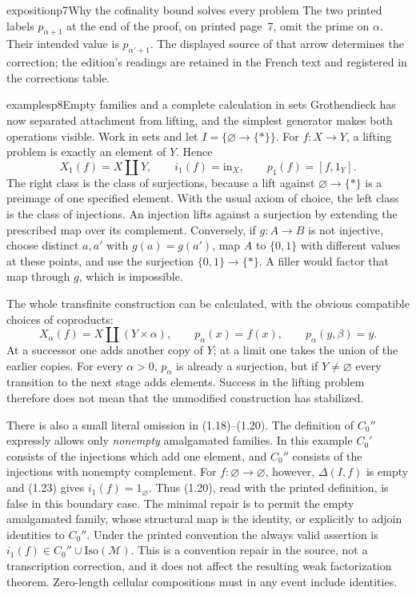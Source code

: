 \begin{dcomment}{exposition}{p7}{Why the cofinality bound solves every problem}
The two printed labels $p_{\alpha+1}$ at the end of the proof, on printed page~7, omit the prime on $\alpha$. Their intended value is $p_{\alpha'+1}$. The displayed source of that arrow determines the correction; the edition's readings are retained in the French text and registered in the corrections table.
\end{dcomment}

\begin{dcomment}{examples}{p8}{Empty families and a complete calculation in sets}
Grothendieck has now separated attachment from lifting, and the simplest generator makes both operations visible. Work in sets and let $I=\{\varnothing\to\{*\}\}$. For $f:X\to Y$, a lifting problem is exactly an element of $Y$. Hence
\[
 X_1(f)=X\amalg Y,\qquad i_1(f)=\mathrm{in}_X,
 \qquad p_1(f)=[f,1_Y].
\]
The right class is the class of surjections, because a lift against $\varnothing\to\{*\}$ is a preimage of one specified element. With the usual axiom of choice, the left class is the class of injections. An injection lifts against a surjection by extending the prescribed map over its complement. Conversely, if $g:A\to B$ is not injective, choose distinct $a,a'$ with $g(a)=g(a')$, map $A$ to $\{0,1\}$ with different values at these points, and use the surjection $\{0,1\}\to\{*\}$. A filler would factor that map through $g$, which is impossible.

The whole transfinite construction can be calculated, with the obvious compatible choices of coproducts:
\[
 X_\alpha(f)=X\amalg(Y\times\alpha),\qquad
 p_\alpha(x)=f(x),\qquad p_\alpha(y,\beta)=y.
\]
At a successor one adds another copy of $Y$; at a limit one takes the union of the earlier copies. For every $\alpha>0$, $p_\alpha$ is already a surjection, but if $Y\ne\varnothing$ every transition to the next stage adds elements. Success in the lifting problem therefore does not mean that the unmodified construction has stabilized.

There is also a small literal omission in (1.18)--(1.20). The definition of $C_0''$ expressly allows only \emph{nonempty} amalgamated families. In this example $C_0'$ consists of the injections which add one element, and $C_0''$ consists of the injections with nonempty complement. For $f:\varnothing\to\varnothing$, however, $\Delta(I,f)$ is empty and (1.23) gives $i_1(f)=1_{\varnothing}$. Thus (1.20), read with the printed definition, is false in this boundary case. The minimal repair is to permit the empty amalgamated family, whose structural map is the identity, or explicitly to adjoin identities to $C_0''$. Under the printed convention the always valid assertion is $i_1(f)\in C_0''\cup\mathrm{Iso}(\mathcal M)$. This is a convention repair in the source, not a transcription correction, and it does not affect the resulting weak factorization theorem. Zero-length cellular compositions must in any event include identities.
\end{dcomment}

